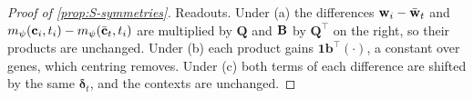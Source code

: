 \begin{proof}[Proof of \cref{prop:S-symmetries}]
Readouts. Under (a) the differences $\mathbf{w}_i - \bar{\mathbf{w}}_t$ and $m_{\psi}(\mathbf{c}_i, t_i) - m_{\psi}(\bar{\mathbf{c}}_t, t_i)$ are multiplied by $\mathbf{Q}$ and $\mathbf{B}$ by $\mathbf{Q}^\top$ on the right, so their products are unchanged. Under (b) each product gains $\mathbf{1}\mathbf{b}^\top(\cdot)$, a constant over genes, which centring removes. Under (c) both terms of each difference are shifted by the same $\boldsymbol{\delta}_t$, and the contexts are unchanged.
\end{proof}
